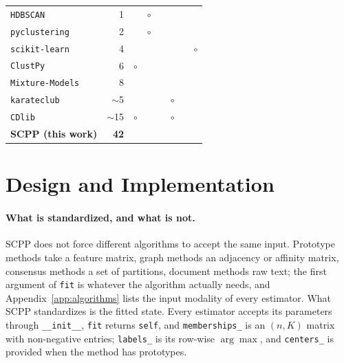\documentclass[twoside,11pt]{article}
\newcommand{\cmark}{\textcolor{green!70!black}{\ding{51}}}
\newcommand{\xmark}{\textcolor{red!75!black}{\ding{55}}}
\newcommand{\pmark}{\textcolor{orange!80!black}{$\circ$}}
\begin{document}
\begin{table}[t]
\begin{tabular}{lrcccccc}
\texttt{HDBSCAN}~\citep{mcinnes2017hdbscan}
& 1 & \xmark & \pmark & \xmark & \xmark & \xmark & \xmark \\

\texttt{pyclustering}~\citep{novikov2019pyclustering}
& 2 & \cmark & \pmark & \xmark & \xmark & \xmark & \xmark \\

\texttt{scikit-learn}~\citep{pedregosa2011scikit}
& 4 & \xmark & \cmark & \xmark & \xmark & \cmark & \pmark \\

\texttt{ClustPy}~\citep{leiber2023benchmarking}
& 6 & \pmark & \cmark & \xmark & \cmark & \xmark & \cmark \\

\texttt{Mixture-Models}~\citep{kasa2024mixture}
& 8 & \xmark & \cmark & \xmark & \xmark & \xmark & \xmark \\

\texttt{karateclub}~\citep{rozemberczki2020karateclub}
& $\sim$5 & \xmark & \xmark & \cmark & \pmark & \xmark & \xmark \\

\texttt{CDlib}~\citep{rossetti2019cdlib}
& $\sim$15 & \pmark & \xmark & \cmark & \pmark & \xmark & \cmark \\

\midrule
\rowcolor{scppbg}
\textbf{SCPP (this work)}
& \textbf{42}
& \cmark
& \cmark
& \cmark
& \cmark
& \cmark
& \cmark \\

\bottomrule
\end{tabular}
\end{table}




\section{Design and Implementation}
\label{sec:design}

\paragraph{What is standardized, and what is not.}
SCPP does not force different algorithms to accept the same input. Prototype
methods take a feature matrix, graph methods an adjacency or affinity matrix,
consensus methods a set of partitions, document methods raw text; the first
argument of \texttt{fit} is whatever the algorithm actually needs, and
Appendix~\ref{app:algorithms} lists the input modality of every estimator.
What SCPP standardizes is the fitted state. Every estimator accepts its
parameters through \texttt{\_\_init\_\_}, \texttt{fit} returns \texttt{self},
and \texttt{memberships\_} is an $(n, K)$ matrix with non-negative entries;
\texttt{labels\_} is its row-wise $\arg\max$, and \texttt{centers\_} is
provided when the method has prototypes.
\end{document}
